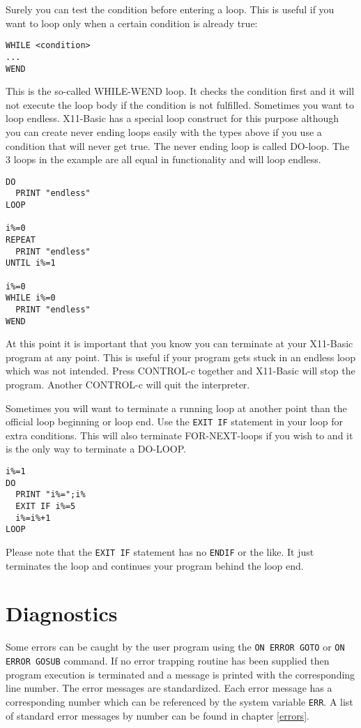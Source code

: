 Surely you can test the condition before entering a loop. This is useful if you
want to loop only when a certain condition is already true:

\begin{verbatim}
WHILE <condition>
...
WEND
\end{verbatim}

This is the so-called WHILE-WEND loop. It checks the condition first and it
will not execute the loop body if the condition is not fulfilled. Sometimes you
want to loop endless. X11-Basic has a special loop construct for this purpose
although you can create never ending loops easily with the types above if you
use a condition that will never get true. The never ending loop is called
DO-loop. The 3 loops in the example are all equal in functionality and will
loop endless.

\begin{mdframed}[hidealllines=true,backgroundcolor=blue!20]
\begin{verbatim}
DO
  PRINT "endless"
LOOP

i%=0
REPEAT
  PRINT "endless"
UNTIL i%=1

i%=0
WHILE i%=0
  PRINT "endless"
WEND
\end{verbatim}
\end{mdframed}

At this point it is important that you know you can terminate at your X11-Basic
program at any point. This is useful if your program
gets stuck in an endless loop which was not intended. Press CONTROL-c together 
and X11-Basic will stop the program. Another CONTROL-c will quit the interpreter.

Sometimes you will want to terminate a running loop at another point than the
official loop beginning or loop end. Use the \verb|EXIT IF| statement in your loop for
extra conditions. This will also terminate FOR-NEXT-loops if you wish to and it
is the only way to terminate a DO-LOOP.

\begin{mdframed}[hidealllines=true,backgroundcolor=blue!20]
\begin{verbatim}
i%=1
DO
  PRINT "i%=";i%
  EXIT IF i%=5
  i%=i%+1
LOOP
\end{verbatim}
\end{mdframed}

Please note that the \verb|EXIT IF| statement has no \verb|ENDIF| or the like.
It just terminates the loop and continues your program behind the loop end.

\section{Diagnostics}

Some errors can be caught by the user program using the \verb|ON ERROR GOTO| or
\verb|ON ERROR GOSUB| command. If no error trapping routine has been supplied
then program execution is terminated and a message is printed with the
corresponding line number. The error messages are standardized. Each error 
message has a corresponding number which can be referenced by the system variable 
\verb|ERR|. A list of standard error messages by number can be found in chapter
\ref{errors}.
